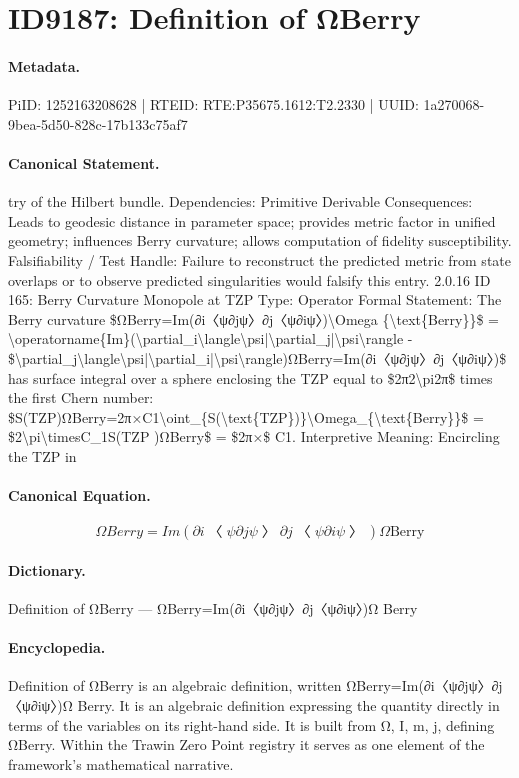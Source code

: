 \section*{ID9187: Definition of ΩBerry}
\paragraph{Metadata.}
PiID: 1252163208628 | RTEID: RTE:P35675.1612:T2.2330 | UUID: 1a270068-9bea-5d50-828c-17b133c75af7

\paragraph{Canonical Statement.}
try of the Hilbert bundle. Dependencies: Primitive Derivable Consequences: Leads to geodesic distance in parameter space; provides metric factor in unified geometry; influences Berry curvature; allows computation of fidelity susceptibility. Falsifiability / Test Handle: Failure to reconstruct the predicted metric from state overlaps or to observe predicted singularities would falsify this entry. 2.0.16 ID 165: Berry Curvature Monopole at TZP Type: Operator Formal Statement: The Berry curvature \$ΩBerry=Im(∂i〈ψ∂jψ〉∂j〈ψ∂iψ〉)\textbackslash{}Omega \{\textbackslash{}text\{Berry\}\}\$ = \textbackslash{}operatorname\{Im\}(\textbackslash{}partial\_i\textbackslash{}langle\textbackslash{}psi|\textbackslash{}partial\_j|\textbackslash{}psi\textbackslash{}rangle - \$\textbackslash{}partial\_j\textbackslash{}langle\textbackslash{}psi|\textbackslash{}partial\_i|\textbackslash{}psi\textbackslash{}rangle)ΩBerry=Im(∂i〈ψ∂jψ〉∂j〈ψ∂iψ〉)\$ has surface integral over a sphere enclosing the TZP equal to \$2π2\textbackslash{}pi2π\$ times the first Chern number: \$S(TZP)ΩBerry=2π×C1\textbackslash{}oint\_\{S(\textbackslash{}text\{TZP\})\}\textbackslash{}Omega\_\{\textbackslash{}text\{Berry\}\}\$ = \$2\textbackslash{}pi\textbackslash{}timesC\_1S(TZP )ΩBerry\$ = \$2π×\$ C1. Interpretive Meaning: Encircling the TZP in

\paragraph{Canonical Equation.}
\[
ΩBerry=Im(∂i〈ψ∂jψ〉∂j〈ψ∂iψ〉)\Omega {\text{Berry}}
\]

\paragraph{Dictionary.}
Definition of ΩBerry — ΩBerry=Im(∂i〈ψ∂jψ〉∂j〈ψ∂iψ〉)Ω Berry

\paragraph{Encyclopedia.}
Definition of ΩBerry is an algebraic definition, written ΩBerry=Im(∂i〈ψ∂jψ〉∂j〈ψ∂iψ〉)Ω Berry. It is an algebraic definition expressing the quantity directly in terms of the variables on its right-hand side. It is built from Ω, I, m, j, defining ΩBerry. Within the Trawin Zero Point registry it serves as one element of the framework's mathematical narrative.
